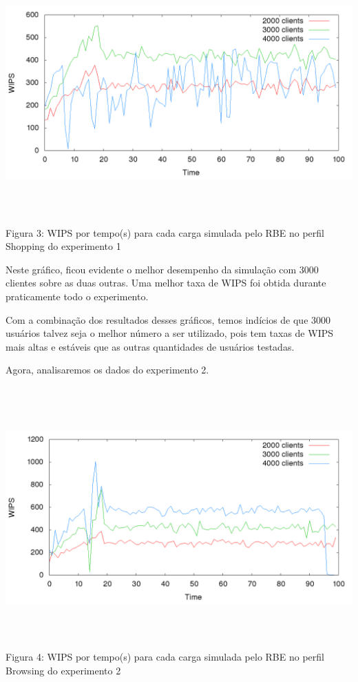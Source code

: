 \documentclass[11pt,twoside]{article}
\begin{document}
\begin{center}
\includegraphics[width=15cm, height=10cm]{images/exp1/plot_shopping}
Figura 3: WIPS por tempo(s) para cada carga simulada pelo RBE no perfil Shopping do experimento 1
\end{center}

Neste gráfico, ficou evidente o melhor desempenho da simulação com 3000 clientes sobre as duas outras. Uma melhor taxa de WIPS foi obtida durante praticamente todo o experimento.

Com a combinação dos resultados desses gráficos, temos indícios de que 3000 usuários talvez seja o melhor número a ser utilizado, pois tem taxas de WIPS mais altas e estáveis que as outras quantidades de usuários testadas.

Agora, analisaremos os dados do experimento 2.

\begin{center}
\includegraphics[width=15cm, height=10cm]{images/exp2/plot_browsin}
Figura 4: WIPS por tempo(s) para cada carga simulada pelo RBE no perfil Browsing do experimento 2
\end{center}
\end{document}
